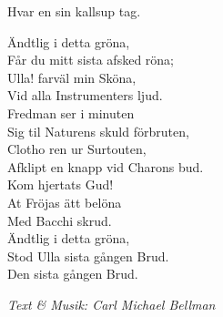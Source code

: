 Hvar en sin kallsup tag.\par
\vspace{10pt}
Ändtlig i detta gröna,\\ 
Får du mitt sista afsked röna;\\ 
Ulla! farväl min Sköna,\\ 
Vid alla Instrumenters ljud.\\ 
Fredman ser i minuten\\ 
Sig til Naturens skuld förbruten,\\ 
Clotho ren ur Surtouten,\\ 
Afklipt en knapp vid Charons bud.\\ 
Kom hjertats Gud!\\ 
At Fröjas ätt belöna\\ 
Med Bacchi skrud.\\ 
Ändtlig i detta gröna,\\ 
Stod Ulla sista gången Brud.\\ 
Den sista gången Brud.\par
\vspace{10pt}
{\footnotesize\textit{Text & Musik: Carl Michael Bellman}}
